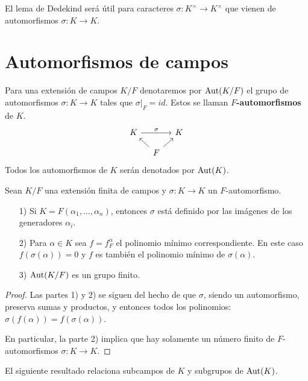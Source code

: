 El lema de Dedekind será útil para caracteres $\sigma\colon K^\times \to K^\times$
que vienen de automorfismos $\sigma\colon K\to K$.


\section{Automorfismos de campos}

Para una extensión de campos $K/F$ denotaremos por $\operatorname{Aut} (K/F)$ el grupo de
automorfismos $\sigma\colon K\to K$ tales que
$\left.\sigma\right|_F = id$. Estos se llaman \textbf{$F$-automorfismos} de $K$.
\[ \begin{tikzcd}[row sep=1em, column sep=1em]
  K \ar{rr}{\sigma} && K \\
   & F\ar{ul}\ar{ur}
\end{tikzcd} \]
Todos los automorfismos de $K$ serán denotados por $\operatorname{Aut} (K)$.

\begin{proposicion}
  Sean $K/F$ una extensión finita de campos y $\sigma\colon K\to K$ un
  $F$-automorfismo.

  \begin{enumerate}
  \item[1)] Si $K = F (\alpha_1,\ldots,\alpha_n)$, entonces $\sigma$ está
    definido por las imágenes de los generadores $\alpha_i$.

  \item[2)] Para $\alpha \in K$ sea $f = f^\alpha_F$ el polinomio mínimo
    correspondiente. En este caso $f (\sigma (\alpha)) = 0$ y $f$ es también
    el polinomio mínimo de $\sigma (\alpha)$.

  \item[3)] $\operatorname{Aut} (K/F)$ es un grupo finito.
  \end{enumerate}

  \begin{proof}
    Las partes 1) y 2) se siguen del hecho de que $\sigma$, siendo un
    automorfismo, preserva sumas y productos, y entonces todos los polinomios:
    $\sigma (f (\alpha)) = f (\sigma (\alpha))$.

    En particular, la parte 2) implica que hay solamente un número finito de
    $F$-automorfismos $\sigma\colon K\to K$.
  \end{proof}
\end{proposicion}

El siguiente resultado relaciona subcampos de $K$ y subgrupos de $\operatorname{Aut} (K)$.

